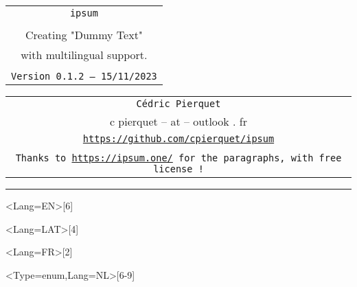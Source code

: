 \documentclass[11pt,a4paper]{ltxdoc}
\def\TPversion{0.1.2}
\def\TPdate{15/11/2023}
\begin{document}
\pagestyle{fancy}

\thispagestyle{empty}

\begin{center}
	\begin{minipage}{0.88\linewidth}
	\begin{tcolorbox}[colframe=yellow,colback=yellow!15]
		\begin{center}
			\begin{tabular}{c}
				{\Huge \texttt{ipsum}}\\
				\\
				{\LARGE Creating "Dummy Text"} \\
				{\LARGE with multilingual support.} \\
				\\
				{\small \texttt{Version \TPversion{} -- \TPdate}}
		\end{tabular}
		\end{center}
	\end{tcolorbox}
\end{minipage}
\end{center}

\begin{center}
	\begin{tabular}{c}
	\texttt{Cédric Pierquet}\\
	{\ttfamily c pierquet -- at -- outlook . fr}\\
	\texttt{\url{https://github.com/cpierquet/ipsum}} \\
	\\
	\texttt{Thanks to \url{https://ipsum.one/} for the paragraphs, with free license !}
\end{tabular}
\end{center}

\hrule

\vfill

\begin{tcolorbox}[colframe=lightgray,colback=lightgray!5]
\ipsum<Lang=EN>[6]
\end{tcolorbox}

\begin{tcolorbox}[colframe=lightgray,colback=lightgray!5]
\ipsum<Lang=LAT>[4]
\end{tcolorbox}

\begin{tcolorbox}[colframe=lightgray,colback=lightgray!5]
\ipsum<Lang=FR>[2]
\end{tcolorbox}

\begin{tcolorbox}[colframe=lightgray,colback=lightgray!5]
\ipsum<Type=enum,Lang=NL>[6-9]
\end{tcolorbox}
\end{document}
